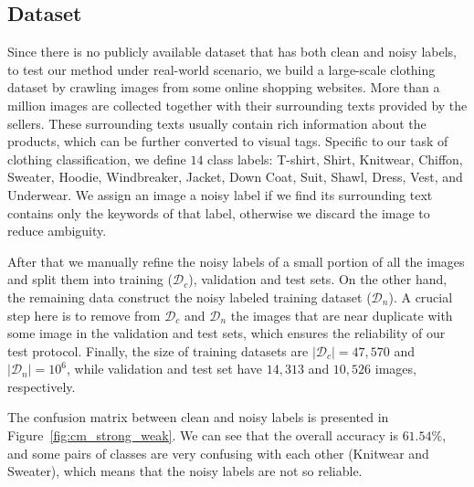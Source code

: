 \documentclass[10pt,twocolumn,letterpaper]{article}
\begin{document}
\subsection{Dataset} %
\label{sub:dataset}
Since there is no publicly available dataset that has both clean and noisy labels, to test our method under real-world scenario, we build a large-scale clothing dataset by crawling images from some online shopping websites. More than a million images are collected together with their surrounding texts provided by the sellers. These surrounding texts usually contain rich information about the products, which can be further converted to visual tags. Specific to our task of clothing classification, we define $14$ class labels: T-shirt, Shirt, Knitwear, Chiffon, Sweater, Hoodie, Windbreaker, Jacket, Down Coat, Suit, Shawl, Dress, Vest, and Underwear. We assign an image a noisy label if we find its surrounding text contains only the keywords of that label, otherwise we discard the image to reduce ambiguity.

After that we manually refine the noisy labels of a small portion of all the images and split them into training ($\mathcal{D}_c$), validation and test sets. On the other hand, the remaining data construct the noisy labeled training dataset ($\mathcal{D}_n$). A crucial step here is to remove from $\mathcal{D}_c$ and $\mathcal{D}_n$ the images that are near duplicate with some image in the validation and test sets, which ensures the reliability of our test protocol. Finally, the size of training datasets are $|\mathcal{D}_c| = 47,570$ and $|\mathcal{D}_n| = 10^6$, while validation and test set have $14,313$ and $10,526$ images, respectively.

The confusion matrix between clean and noisy labels is presented in Figure~\ref{fig:cm_strong_weak}. We can see that the overall accuracy is $61.54\%$, and some pairs of classes are very confusing with each other (\eg Knitwear and Sweater), which means that the noisy labels are not so reliable.
\end{document}
